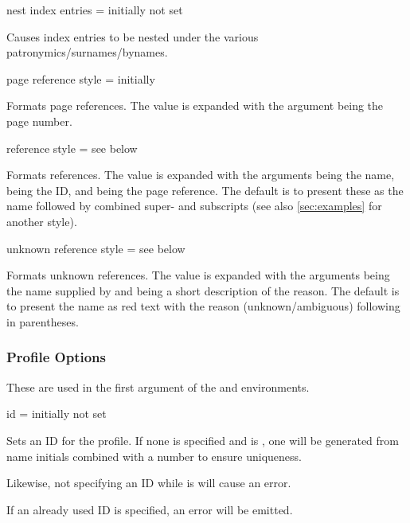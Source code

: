 \documentclass[
	a4paper,
]{article}
\begin{document}
\begin{docKey}
	{nest index entries}
	{=}
	{initially not set}

	Causes index entries to be nested under the various patronymics/surnames/bynames.
\end{docKey}

\begin{docKey}
	{page reference style}
	{=}
	{initially }

	Formats page references. The value is expanded with the argument  being the page number.
\end{docKey}

\begin{docKey}
	{reference style}
	{=}
	{see below}

	Formats references. The value is expanded with the arguments  being the name,  being the ID, and  being the page reference. The default is to present these as the name followed by combined super- and subscripts (see also \cref{sec:examples} for another style).
\end{docKey}

\begin{docKey}
	{unknown reference style}
	{=}
	{see below}

	Formats unknown references. The value is expanded with the arguments  being the name supplied by  and  being a short description of the reason. The default is to present the name as red text with the reason (unknown/ambiguous) following in parentheses.
\end{docKey}


\subsubsection{Profile Options} %

\label{sec:profopts}
These are used in the first argument of the  and  environments.

\begin{docKey}
	{id}
	{=}
	{initially not set}

	Sets an ID for the profile. If none is specified and  is , one will be generated from name initials combined with a number to ensure uniqueness.

	Likewise, not specifying an ID while  is  will cause an error.

	If an already used ID is specified, an error will be emitted.
\end{docKey}
\end{document}
